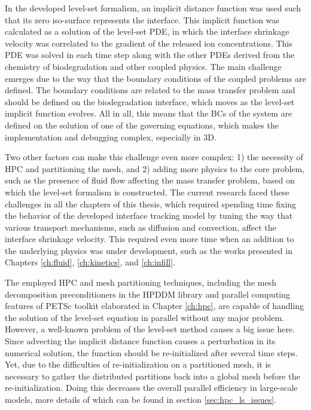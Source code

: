 In the developed level-set formalism, an implicit distance function was used such that its zero iso-surface represents the interface. This implicit function was calculated as a solution of the level-set \gls{PDE}, in which the interface shrinkage velocity was correlated to the gradient of the released ion concentrations. This \gls{PDE} was solved in each time step along with the other \gls{PDE}s derived from the chemistry of biodegradation and other coupled physics. The main challenge emerges due to the way that the boundary conditions of the coupled problems are defined. The boundary conditions are related to the mass transfer problem and should be defined on the biodegradation interface, which moves as the level-set implicit function evolves. All in all, this means that the BCs of the system are defined on the solution of one of the governing equations, which makes the implementation and debugging complex, especially in 3D.

Two other factors can make this challenge even more complex: 1) the necessity of \gls{HPC} and partitioning the mesh, and 2) adding more physics to the core problem, such as the presence of fluid flow affecting the mass transfer problem, based on which the level-set formalism is constructed. The current research faced these challenges in all the chapters of this thesis, which required spending time fixing the behavior of the developed interface tracking model by tuning the way that various transport mechanisms, such as diffusion and convection, affect the interface shrinkage velocity. This required even more time when an addition to the underlying physics was under development, such as the works presented in Chapters \ref{ch:fluid}, \ref{ch:kinetics}, and \ref{ch:infill}.

The employed \gls{HPC} and mesh partitioning techniques, including the mesh decomposition preconditioners in the \gls{HPDDM} library and parallel computing features of \gls{PETSc} toolkit elaborated in Chapter \ref{ch:hpc}, are capable of handling the solution of the level-set equation in parallel without any major problem. However, a well-known problem of the level-set method causes a big issue here. Since advecting the implicit distance function causes a perturbation in its numerical solution, the function should be re-initialized after several time steps. Yet, due to the difficulties of re-initialization on a partitioned mesh, it is necessary to gather the distributed partitions back into a global mesh before the re-initialization. Doing this decreases the overall parallel efficiency in large-scale models, more details of which can be found in section \ref{sec:hpc_ls_issues}.

